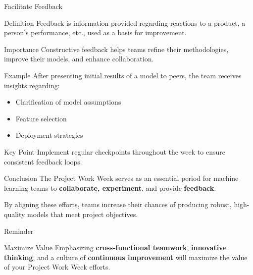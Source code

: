 \documentclass[aspectratio=169]{beamer}
\begin{document}
\begin{frame}[fragile]{Facilitate Feedback}
    \begin{block}{Definition}
        Feedback is information provided regarding reactions to a product, a person's performance, etc., used as a basis for improvement.
    \end{block}

    \begin{block}{Importance}
        Constructive feedback helps teams refine their methodologies, improve their models, and enhance collaboration.
    \end{block}

    \begin{block}{Example}
        After presenting initial results of a model to peers, the team receives insights regarding:
        \begin{itemize}
            \item Clarification of model assumptions
            \item Feature selection
            \item Deployment strategies
        \end{itemize}
    \end{block}

    \begin{block}{Key Point}
        Implement regular checkpoints throughout the week to ensure consistent feedback loops.
    \end{block}
\end{frame}

\begin{frame}[fragile]{Conclusion}
    The Project Work Week serves as an essential period for machine learning teams to 
    \textbf{collaborate, experiment}, and provide \textbf{feedback}. 

    By aligning these efforts, teams increase their chances of producing robust, high-quality models that meet project objectives.
\end{frame}

\begin{frame}[fragile]{Reminder}
    \begin{block}{Maximize Value}
        Emphasizing \textbf{cross-functional teamwork}, \textbf{innovative thinking}, and a culture of \textbf{continuous improvement} will maximize the value of your Project Work Week efforts.
    \end{block}
\end{frame}
\end{document}
